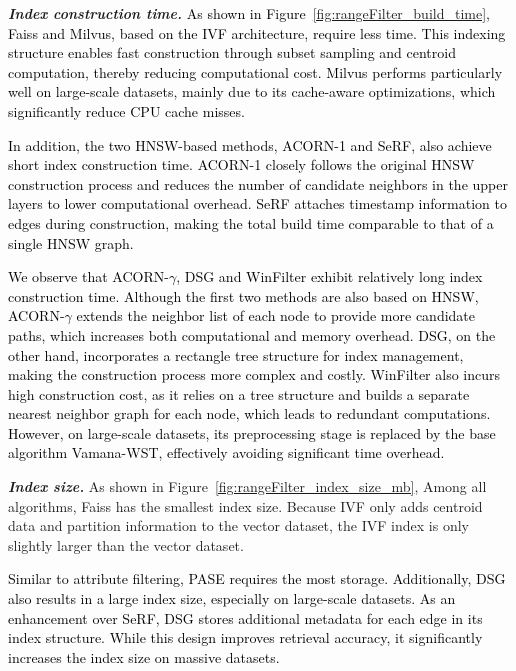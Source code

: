 \documentclass[sigconf, nonacm, pdfa]{acmart}
\begin{document}
{	\textit{\textbf{Index construction time.}}
	\textcolor{black}{
	As shown in Figure~\ref{fig:rangeFilter_build_time}, Faiss and Milvus, based on the IVF architecture, require less time. This indexing structure enables fast construction through subset sampling and centroid computation, thereby reducing computational cost. Milvus performs particularly well on large-scale datasets, mainly due to its cache-aware optimizations, which significantly reduce CPU cache misses.}



\textcolor{black}{In addition, the two HNSW-based methods, ACORN-1 and SeRF, also achieve short index construction time. ACORN-1 closely follows the original HNSW construction process and reduces the number of candidate neighbors in the upper layers to lower computational overhead. SeRF attaches timestamp information to edges during construction, making the total build time comparable to that of a single HNSW graph.
	}



\textcolor{black}{We observe that ACORN-\(\gamma\), DSG and WinFilter exhibit relatively long index construction time. Although the first two methods are also based on HNSW, ACORN-\(\gamma\) extends the neighbor list of each node to provide more candidate paths, which increases both computational and memory overhead. DSG, on the other hand, incorporates a rectangle tree structure for index management, making the construction process more complex and costly. 
WinFilter also incurs high construction cost, as it relies on a tree structure and builds a separate nearest neighbor graph for each node, which leads to redundant computations. However, on large-scale datasets, its preprocessing stage is replaced by the base algorithm Vamana-WST, effectively avoiding significant time overhead.}





	
	


	
	\textit{\textbf{Index size.}} 
	As shown in Figure~\ref{fig:rangeFilter_index_size_mb}, Among all algorithms, Faiss has the smallest index size. Because IVF only adds centroid data and partition information to the vector dataset, the IVF index is only slightly larger than the vector dataset.

	
	\textcolor{black}{Similar to attribute filtering, PASE requires the most storage. }
	\textcolor{black}{Additionally, DSG also results in a large index size, especially on large-scale datasets. As an enhancement over SeRF, DSG stores additional metadata for each edge in its index structure. While this design improves retrieval accuracy, it significantly increases the index size on massive datasets.}


}
\end{document}

